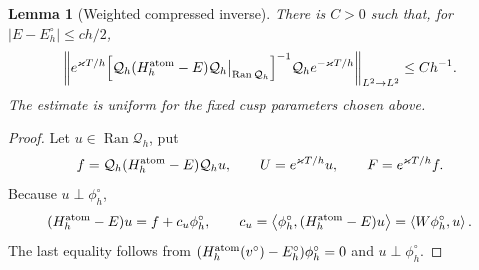 \documentclass[11pt]{article}
\newtheorem{lemma}[theorem]{Lemma}
\newcommand{\cQ}{\mathcal Q}
\newcommand{\norm}[1]{\left\|#1\right\|}
\newcommand{\ip}[2]{\left\langle #1,#2\right\rangle}
\newcommand{\Ran}{\operatorname{Ran}}
\begin{document}
\begin{lemma}[Weighted compressed inverse]\label{lem:weighted-inverse}
There is $C>0$ such that, for $|E-E_h^\circ|\le ch/2$,
\begin{equation}\label{eq:weighted-resolvent}
 \norm{e^{\varkappa T/h}
 \Bigl[\cQ_h(H_h^{\rm atom}-E)\cQ_h\big|_{\Ran\cQ_h}\Bigr]^{-1}
 \cQ_he^{-\varkappa T/h}}_{L^2\to L^2}
 \le Ch^{-1}.
\end{equation}
The estimate is uniform for the fixed cusp parameters chosen above.
\end{lemma}

\begin{proof}
Let $u\in\Ran\cQ_h$, put
\[
 f=\cQ_h(H_h^{\rm atom}-E)\cQ_hu,
 \qquad U=e^{\varkappa T/h}u,
 \qquad F=e^{\varkappa T/h}f.
\]
Because $u\perp\phi_h^\circ$,
\begin{equation}\label{eq:compressed-rank-term}
 (H_h^{\rm atom}-E)u=f+c_u\phi_h^\circ,
 \qquad
 c_u=\ip{\phi_h^\circ}{(H_h^{\rm atom}-E)u}
 =\ip{W\phi_h^\circ}{u}.
\end{equation}
The last equality follows from $(H_h^{\rm atom}(v^\circ)-E_h^\circ)\phi_h^\circ=0$ and $u\perp\phi_h^\circ$.


\end{proof}
\end{document}
